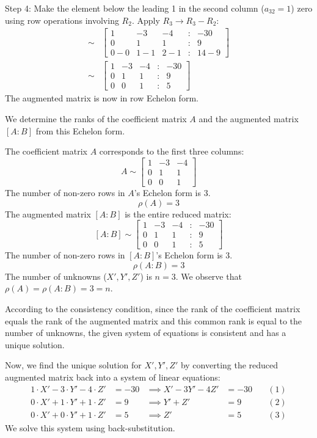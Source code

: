 \documentclass{article}
\begin{document}
Step 4: Make the element below the leading 1 in the second column ($a_{32}=1$) zero using row operations involving $R_2$.
Apply $R_3 \to R_3 - R_2$:
\begin{align*} \sim &\begin{bmatrix} 1 & -3 & -4 & : & -30 \\ 0 & 1 & 1 & : & 9 \\ 0 - 0 & 1 - 1 & 2 - 1 & : & 14 - 9 \end{bmatrix} \\ \sim &\begin{bmatrix} 1 & -3 & -4 & : & -30 \\ 0 & 1 & 1 & : & 9 \\ 0 & 0 & 1 & : & 5 \end{bmatrix}\end{align*}
The augmented matrix is now in row Echelon form.

We determine the ranks of the coefficient matrix $A$ and the augmented matrix $[A:B]$ from this Echelon form.

The coefficient matrix $A$ corresponds to the first three columns:
\[ A \sim \begin{bmatrix} 1 & -3 & -4 \\ 0 & 1 & 1 \\ 0 & 0 & 1 \end{bmatrix} \]
The number of non-zero rows in $A$'s Echelon form is 3.
\[ \rho(A) = 3 \]
The augmented matrix $[A:B]$ is the entire reduced matrix:
\[ [A:B] \sim \begin{bmatrix} 1 & -3 & -4 & : & -30 \\ 0 & 1 & 1 & : & 9 \\ 0 & 0 & 1 & : & 5 \end{bmatrix} \]
The number of non-zero rows in $[A:B]$'s Echelon form is 3.
\[ \rho(A:B) = 3 \]
The number of unknowns ($X', Y', Z'$) is $n=3$.
We observe that $\rho(A) = \rho(A:B) = 3 = n$.

According to the consistency condition, since the rank of the coefficient matrix equals the rank of the augmented matrix and this common rank is equal to the number of unknowns, the given system of equations is consistent and has a unique solution.

Now, we find the unique solution for $X', Y', Z'$ by converting the reduced augmented matrix back into a system of linear equations:
\begin{align*} 1 \cdot X' - 3 \cdot Y' - 4 \cdot Z' &= -30 &\implies X' - 3Y' - 4Z' &= -30 \quad &(1) \\ 0 \cdot X' + 1 \cdot Y' + 1 \cdot Z' &= 9 &\implies Y' + Z' &= 9 \quad &(2) \\ 0 \cdot X' + 0 \cdot Y' + 1 \cdot Z' &= 5 &\implies Z' &= 5 \quad &(3) \end{align*}
We solve this system using back-substitution.
\end{document}
